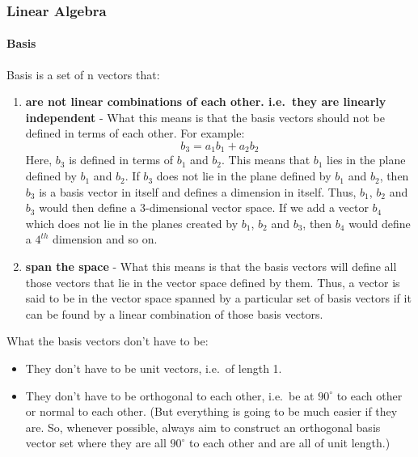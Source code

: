 \documentclass[11pt]{article}
\providecommand{\tightlist}{%
      \setlength{\itemsep}{0pt}\setlength{\parskip}{0pt}}
\begin{document}
\hypertarget{linear-algebra}{%
\subsubsection{Linear Algebra}\label{linear-algebra}}

\hypertarget{basis}{%
\paragraph{Basis}\label{basis}}

Basis is a set of n vectors that:

\begin{enumerate}
\def\labelenumi{\arabic{enumi}.}
\item
  \textbf{are not linear combinations of each other. i.e.~they are
  linearly independent} - What this means is that the basis vectors
  should not be defined in terms of each other. For example: \[
  b_{3} = a_{1}b_{1} + a_{2}b_{2}
  \] Here, \(b_{3}\) is defined in terms of \(b_{1}\) and \(b_{2}\).
  This means that \(b_{1}\) lies in the plane defined by \(b_{1}\) and
  \(b_{2}\). If \(b_{3}\) does not lie in the plane defined by \(b_{1}\)
  and \(b_{2}\), then \(b_{3}\) is a basis vector in itself and defines
  a dimension in itself. Thus, \(b_{1}\), \(b_{2}\) and \(b_{3}\) would
  then define a \(3\)-dimensional vector space. If we add a vector
  \(b_{4}\) which does not lie in the planes created by \(b_{1}\),
  \(b_{2}\) and \(b_{3}\), then \(b_{4}\) would define a \(4^{th}\)
  dimension and so on.
\item
  \textbf{span the space} - What this means is that the basis vectors
  will define all those vectors that lie in the vector space defined by
  them. Thus, a vector is said to be in the vector space spanned by a
  particular set of basis vectors if it can be found by a linear
  combination of those basis vectors.
\end{enumerate}

What the basis vectors don't have to be:

\begin{itemize}
\tightlist
\item
  They don't have to be unit vectors, i.e.~of length 1.
\item
  They don't have to be orthogonal to each other, i.e.~be at
  \(90^{\circ}\) to each other or normal to each other. (But everything
  is going to be much easier if they are. So, whenever possible, always
  aim to construct an orthogonal basis vector set where they are all
  \(90^{\circ}\) to each other and are all of unit length.)
\end{itemize}
\end{document}
